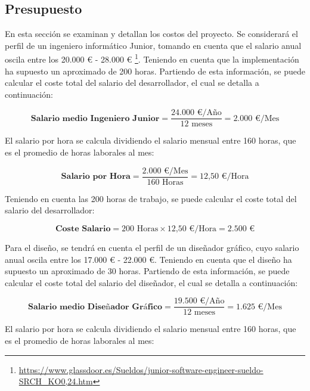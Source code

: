 \subsection{Presupuesto}

En esta sección se examinan y detallan los costos del proyecto. Se considerará el perfil de un ingeniero informático Junior, tomando en cuenta que el salario anual oscila entre los 20.000 € - 28.000 € \footnote{\url{https://www.glassdoor.es/Sueldos/junior-software-engineer-sueldo-SRCH_KO0,24.htm}}. Teniendo en cuenta que la implementación ha supuesto un aproximado de 200 horas. Partiendo de esta información, se puede calcular el coste total del salario del desarrollador, el cual se detalla a continuación:

\begin{equation}
    \textbf{Salario medio Ingeniero Junior} =  \frac {\text{24.000 €/Año} }{ \text{12 meses}} = \text{2.000 €/Mes}
\end{equation}

El salario por hora se calcula dividiendo el salario mensual entre 160 horas, que es el promedio de horas laborales al mes:

\begin{equation}
    \textbf{Salario por Hora} = \frac {\text{2.000 €/Mes}}{160 \text{ Horas}} = \text{12,50 €/Hora}
\end{equation}

Teniendo en cuenta las 200 horas de trabajo, se puede calcular el coste total del salario del desarrollador:

\begin{equation}
    \textbf{Coste Salario} = \text{200 Horas} \times \text{12,50 €/Hora} = \text{2.500 €}
\end{equation}

Para el diseño, se tendrá en cuenta el perfil de un diseñador gráfico, cuyo salario anual oscila entre los 17.000 € - 22.000 €. Teniendo en cuenta que el diseño ha supuesto un aproximado de 30 horas. Partiendo de esta información, se puede calcular el coste total del salario del diseñador, el cual se detalla a continuación:

\begin{equation}
    \textbf{Salario medio Diseñador Gráfico} =  \frac {\text{19.500 €/Año} }{ \text{12 meses}} = \text{1.625 €/Mes}
\end{equation}

El salario por hora se calcula dividiendo el salario mensual entre 160 horas, que es el promedio de horas laborales al mes:

